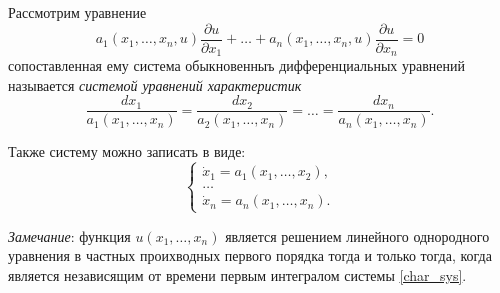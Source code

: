 Рассмотрим уравнение
\begin{equation*}
	a_1(x_1, \dotsc, x_n, u) \frac{\partial u}{\partial x_1} + \dotsc + a_n(x_1, \dotsc, x_n, u) \frac{\partial u}{\partial x_n} = 0
\end{equation*}
сопоставленная ему система обыкновенныъ дифференциальных уравнений называется \textit{системой уравнений характеристик}
\begin{equation}
	\frac{d x_1}{a_1(x_1, \dotsc, x_n)} = \frac{d x_2}{a_2(x_1, \dotsc, x_n)} = \dotsc = \frac{d x_n}{a_n(x_1, \dotsc, x_n)}.
\end{equation}

Также систему можно записать в виде:
\begin{equation} \label{char_sys}
	\begin{cases}
		\dot{x}_1 = a_1(x_1, \dotsc, x_2), \\
		\dotsc \\
		\dot{x}_n = a_n(x_1, \dotsc, x_n).
	\end{cases} \tag{5'}
\end{equation}

\textit{Замечание}: функция $ u(x_1, \dotsc, x_n) $ является решением линейного однородного уравнения в частных проихводных первого порядка тогда и только тогда, когда является независящим от времени первым интегралом системы \eqref{char_sys}. 